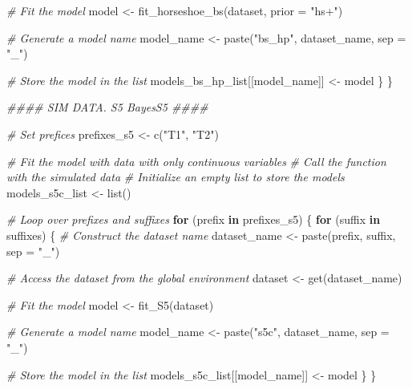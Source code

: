 \documentclass[
  11pt,
]{article}
\newenvironment{Shaded}{}{}
\newcommand{\AttributeTok}[1]{\textcolor[rgb]{0.49,0.56,0.16}{#1}}
\newcommand{\CommentTok}[1]{\textcolor[rgb]{0.38,0.63,0.69}{\textit{#1}}}
\newcommand{\ControlFlowTok}[1]{\textcolor[rgb]{0.00,0.44,0.13}{\textbf{#1}}}
\newcommand{\DocumentationTok}[1]{\textcolor[rgb]{0.73,0.13,0.13}{\textit{#1}}}
\newcommand{\FunctionTok}[1]{\textcolor[rgb]{0.02,0.16,0.49}{#1}}
\newcommand{\NormalTok}[1]{#1}
\newcommand{\OtherTok}[1]{\textcolor[rgb]{0.00,0.44,0.13}{#1}}
\newcommand{\StringTok}[1]{\textcolor[rgb]{0.25,0.44,0.63}{#1}}
\begin{document}
\begin{Shaded}
\begin{Highlighting}[]
    \CommentTok{\# Fit the model}
\NormalTok{    model }\OtherTok{\textless{}{-}} \FunctionTok{fit\_horseshoe\_bs}\NormalTok{(dataset, }\AttributeTok{prior =} \StringTok{"hs+"}\NormalTok{)}
    
    \CommentTok{\# Generate a model name}
\NormalTok{    model\_name }\OtherTok{\textless{}{-}} \FunctionTok{paste}\NormalTok{(}\StringTok{"bs\_hp"}\NormalTok{, dataset\_name, }\AttributeTok{sep =} \StringTok{"\_"}\NormalTok{)}
    
    \CommentTok{\# Store the model in the list}
\NormalTok{    models\_bs\_hp\_list[[model\_name]] }\OtherTok{\textless{}{-}}\NormalTok{ model}
\NormalTok{  \}}
\NormalTok{\}}

\DocumentationTok{\#\#\#\# SIM DATA. S5 \textquotesingle{}BayesS5\textquotesingle{} \#\#\#\#}

\CommentTok{\# Set prefices}
\NormalTok{prefixes\_s5 }\OtherTok{\textless{}{-}} \FunctionTok{c}\NormalTok{(}\StringTok{"T1"}\NormalTok{, }\StringTok{"T2"}\NormalTok{)}

\CommentTok{\# Fit the model with data with only continuous variables}
\CommentTok{\# Call the function with the simulated data}
\CommentTok{\# Initialize an empty list to store the models}
\NormalTok{models\_s5c\_list }\OtherTok{\textless{}{-}} \FunctionTok{list}\NormalTok{()}

\CommentTok{\#   Loop over prefixes and suffixes}
\ControlFlowTok{for}\NormalTok{ (prefix }\ControlFlowTok{in}\NormalTok{ prefixes\_s5) \{}
  \ControlFlowTok{for}\NormalTok{ (suffix }\ControlFlowTok{in}\NormalTok{ suffixes) \{}
    \CommentTok{\# Construct the dataset name}
\NormalTok{    dataset\_name }\OtherTok{\textless{}{-}} \FunctionTok{paste}\NormalTok{(prefix, suffix, }\AttributeTok{sep =} \StringTok{"\_"}\NormalTok{)}
    
    \CommentTok{\# Access the dataset from the global environment}
\NormalTok{    dataset }\OtherTok{\textless{}{-}} \FunctionTok{get}\NormalTok{(dataset\_name)}
    
    \CommentTok{\# Fit the model}
\NormalTok{    model }\OtherTok{\textless{}{-}} \FunctionTok{fit\_S5}\NormalTok{(dataset)}
    
    \CommentTok{\# Generate a model name}
\NormalTok{    model\_name }\OtherTok{\textless{}{-}} \FunctionTok{paste}\NormalTok{(}\StringTok{"s5c"}\NormalTok{, dataset\_name, }\AttributeTok{sep =} \StringTok{"\_"}\NormalTok{)}
    
    \CommentTok{\# Store the model in the list}
\NormalTok{    models\_s5c\_list[[model\_name]] }\OtherTok{\textless{}{-}}\NormalTok{ model}
\NormalTok{  \}}
\NormalTok{\}}


\end{Highlighting}
\end{Shaded}
\end{document}
